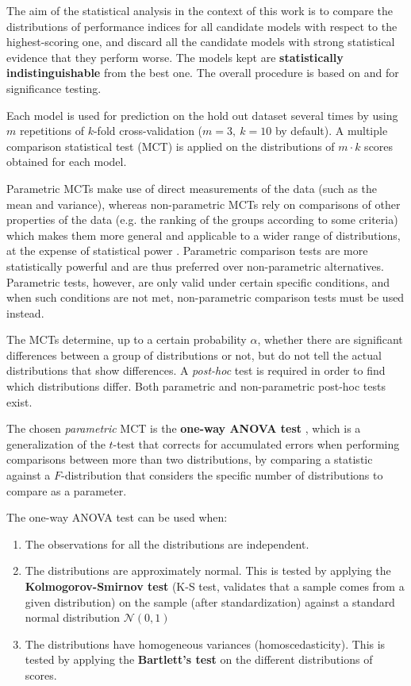 The aim of the statistical analysis in the context of this work is to compare the distributions of
performance indices for all candidate models with respect to the highest-scoring one, and discard
all the candidate models with strong statistical evidence that they perform worse. The models kept
are {\bf statistically indistinguishable} from the best one. The overall procedure is based on
\cite{pizarro2002mct} and \cite{demsar2006mct} for significance testing.

Each model is used for prediction on the hold out dataset several times by using $m$ repetitions of
$k$-fold cross-validation ($m=3,~k=10$ by default). A multiple comparison statistical test (MCT) is
applied on the distributions of $m\cdot k$ scores obtained for each model.

Parametric MCTs make use of direct measurements of the data (such as the mean and variance), whereas
non-parametric MCTs rely on comparisons of other properties of the data (e.g. the ranking of the
groups according to some criteria) which makes them more general and applicable to a wider range of
distributions, at the expense of statistical power \cite{sheskin2003statistics}. Parametric
comparison tests are more statistically powerful and are thus preferred over non-parametric
alternatives.  Parametric tests, however, are only valid under certain specific conditions, and when
such conditions are not met, non-parametric comparison tests must be used instead.

The MCTs determine, up to a certain probability $\alpha$, whether there are significant differences between a
group of distributions or not, but do not tell the actual distributions that show differences. A
\emph{post-hoc} test is required in order to find which distributions differ. Both parametric and
non-parametric post-hoc tests exist.

The chosen \emph{parametric} MCT is the {\bf one-way ANOVA test} \cite{fisher1925statistical}, which is a
generalization of the $t$-test that corrects for accumulated errors when performing comparisons
between more than two distributions, by comparing a statistic against a $F$-distribution that
considers the specific number of distributions to compare as a parameter.

The one-way ANOVA test can be used when:
\begin{enumerate}
	\item The observations for all the distributions are independent.
	\item The distributions are approximately normal. This is tested by applying the
	{\bf Kolmogorov-Smirnov test} (K-S test, validates that a sample comes from a given distribution) on
	the sample (after standardization) against a standard normal distribution $\mathcal{N}(0,1)$
	\item The distributions have homogeneous variances (homoscedasticity). This is tested by
	applying the {\bf Bartlett's test} \cite{bartlett1937} on the different distributions of scores.
\end{enumerate}

